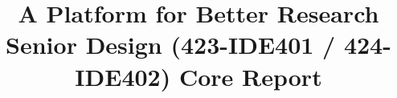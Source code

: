 \title{A Platform for Better Research\\[0.5em]\large Senior Design (423-IDE401 / 424-IDE402) Core Report\\[1.5em]\normalsize\VERSION\\\DocumentStatus}
\author{\DocumentOwner\\\Organization}
\conferraldate{}{\DocumentDate}
\copyrightholder{\Organization}
\maketitle




\clearpage
\begin{abstract}
  
\end{abstract}



\contentspage
\tablelistpage
\figurelistpage
